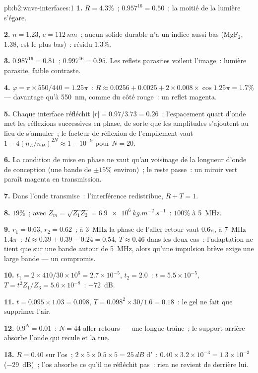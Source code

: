 \begin{solution}{pb:b2:wave-interfaces:1}
\textbf{1.} $R = 4.3\%$~; $0.957^{16} = 0.50$~; la moitié de la lumière s'égare.

\textbf{2.} $n = 1.23$, $e = \qty{112}{nm}$~; aucun solide durable n'a un indice
aussi bas (MgF$_2$, $1.38$, est le plus bas)~: résidu $1.3\%$.

\textbf{3.} $0.987^{16} = 0.81$~; $0.997^{16} = 0.95$. Les reflets parasites voilent
l'image~: lumière parasite, faible contraste.

\textbf{4.} $\varphi = \pi \times 550/440 = 1.25\pi$~: $R \approx 0.0256 + 0.0025 + 2 \times 0.008 \times
\cos1.25\pi = 1.7\%$ --- davantage qu'à \qty{550}{nm}, comme du côté rouge~: un
reflet magenta.

\textbf{5.} Chaque interface réfléchit $|r| = 0.97/3.73 = 0.26$~; l'espacement
quart d'onde met les réflexions successives en phase, de sorte que les amplitudes s'ajoutent
au lieu de s'annuler~; le facteur de réflexion de l'empilement vaut $1 - 4(n_L/n_H)^{2N}
\approx 1 - 10^{-9}$ pour $N = 20$.

\textbf{6.} La condition de mise en phase ne vaut qu'au voisinage de la longueur
d'onde de conception (une bande de $\pm15\%$ environ)~; le reste passe~: un miroir vert
paraît magenta en transmission.

\textbf{7.} Dans l'onde transmise~: l'interférence redistribue,
$R + T = 1$.

\textbf{8.} $19\%$~; avec $Z_m = \sqrt{Z_1Z_2} = \qty{6.9e6}{kg.m^{-2}.s^{-1}}$~: $100\%$ à
\qty{5}{MHz}.

\textbf{9.} $r_1 = 0.63$, $r_2 = 0.62$~; à \qty{3}{MHz} la phase de l'aller-retour vaut
$0.6\pi$, à \qty{7}{MHz} $1.4\pi$~: $R \approx 0.39 + 0.39 - 0.24 = 0.54$, $T \approx 0.46$
dans les deux cas~: l'adaptation ne tient que sur une bande autour de \qty{5}{MHz}, alors qu'une
impulsion brève exige une large bande --- un compromis.

\textbf{10.} $t_1 = 2 \times 410/30 \times 10^6 = 2.7 \times 10^{-5}$, $t_2 = 2.0$~: $t = 5.5 \times 10^{-5}$,
$T = t^2Z_1/Z_3 = 5.6 \times 10^{-8}$~: \qty{-72}{dB}.

\textbf{11.} $t = 0.095 \times 1.03 = 0.098$, $T = 0.098^2 \times 30/1.6 = 0.18$~: le gel
ne fait que supprimer l'air.

\textbf{12.} $0.9^N = 0.01$~: $N = 44$ aller-retours --- une longue traîne~; le
support arrière absorbe l'onde qui recule et la tue.

\textbf{13.} $R = 0.40$ sur l'os~; $2 \times 5 \times 0.5 \times 5 = \qty{25}{dB}$
d'~: $0.40 \times 3.2 \times 10^{-3} = 1.3 \times 10^{-3}$ (\qty{-29}{dB})~; l'os
absorbe ce qu'il ne réfléchit pas~: rien ne revient de derrière lui.


\end{solution}
